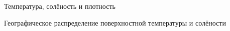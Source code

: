 \begin{chapter}{Температура, солёность и плотность}
\begin{section}{Географическое распределение поверхностной температуры и солёности}


\end{section}
\end{chapter}
